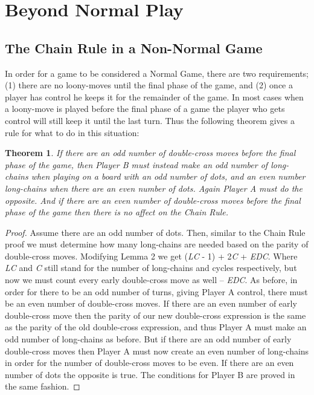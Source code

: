 \documentclass[12pt,twoside]{reedthesis}
\newtheorem{theorem}{Theorem}
\begin{document}
\section{Beyond Normal Play}

\subsection{The Chain Rule in a Non-Normal Game}
In order for a game to be considered a Normal Game, there are two requirements; (1) there are no loony-moves until the final phase of the game, and (2) once a player has control he keeps it for the remainder of the game.  In most cases when a loony-move is played before the final phase of a game the player who gets control will still keep it until the last turn.  Thus the following theorem gives a rule for what to do in this situation:

\begin{theorem}
If there are an odd number of double-cross moves before the final phase of the game, then Player B must instead make an odd number of long-chains when playing on a board with an odd number of dots, and an even number long-chains when there are an even number of dots.  Again Player A must do the opposite.  And if there are an even number of double-cross moves before the final phase of the game then there is no affect on the Chain Rule.
\end{theorem}

\begin{proof}
Assume there are an odd number of dots.  Then, similar to the Chain Rule proof we must determine how many long-chains are needed based on the parity of double-cross moves.  Modifying Lemma 2 we get (\emph{LC} - 1) + 2\emph{C} + \emph{EDC}.  Where \emph{LC} and \emph{C} still stand for the number of long-chains and cycles respectively, but now we must count every early double-cross move as well -- \emph{EDC}.  As before, in order for there to be an odd number of turns, giving Player A control, there must be an even number of double-cross moves.  If there are an even number of early double-cross move then the parity of our new double-cross expression is the same as the parity of the old double-cross expression, and thus Player A must make an odd number of long-chains as before.  But if there are an odd number of early double-cross moves then Player A must now create an even number of long-chains in order for the number of double-cross moves to be even.  If there are an even number of dots the opposite is true.  The conditions for Player B are proved in the same fashion.
\end{proof}
\end{document}
